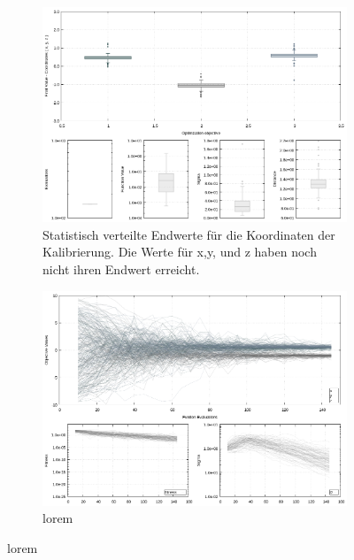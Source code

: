 \begin{figure}[H]
         \centering
         \begin{subfigure}[h]{0.4\textwidth}
                 \centering
                 \includegraphics[width=\textwidth]{img/calibration/aborted_calibration_ant0-boxes.png}
                 \caption{Statistisch verteilte Endwerte für die Koordinaten der Kalibrierung. Die Werte für x,y, und z haben noch nicht ihren Endwert erreicht.}
                 \label{fig:abortedFinal_Calibration_Ant0_ES-boxes}
         \end{subfigure}
%
\qquad         
%
         \begin{subfigure}[h]{0.4\textwidth}
                 \centering
                 \includegraphics[width=\textwidth]{img/calibration/aborted_calibration_ant0-lines.png}
                 \caption{lorem}

\end{subfigure}
\end{figure}
